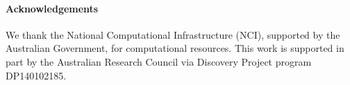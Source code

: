 {
\setlength{\parindent}{0cm}
\paragraph{\bf Acknowledgements}
We thank the National Computational Infrastructure (NCI), supported by the Australian Government, for computational resources.
This work is supported in part by the Australian Research Council via Discovery Project program DP140102185.
}
